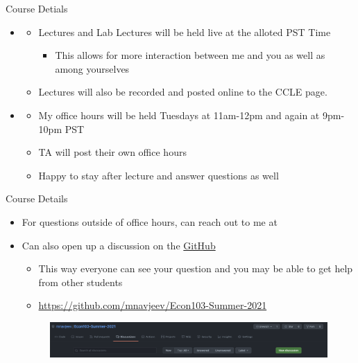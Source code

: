 \documentclass[notheorems,9pt]{beamer}
\begin{document}
\begin{frame}{Course Detials} 
	\begin{itemize}
		\item {}
		\begin{itemize}
			\item Lectures and Lab Lectures will be held live at the alloted PST Time
			\begin{itemize}
				\item This allows for more interaction between me and you as well as among yourselves
			\end{itemize}
			\item Lectures will also be recorded and posted online to the CCLE page.
		\end{itemize}
	\item {}
	\begin{itemize}
		\item My office hours will be held Tuesdays at 11am-12pm and again at 9pm-10pm PST
		\item TA will post their own office hours
		\item Happy to stay after lecture and answer questions as well
	\end{itemize}
	\end{itemize}
\end{frame}

\begin{frame}{Course Details} 
	\begin{itemize}
		\item For questions outside of office hours, can reach out to me at 
		\item Can also open up a discussion on the \href{https://github.com/mnavjeev/Econ103-Summer-2021}{GitHub} 
		\begin{itemize}
			\item This way everyone can see your question and you may be able to get help from other students
			\item \href{https://github.com/mnavjeev/Econ103-Summer-2021}{https://github.com/mnavjeev/Econ103-Summer-2021}
		\end{itemize}
		\begin{figure}[htpb]
			\centering
			\includegraphics[width=0.95\linewidth]{GitHub.png}
		\end{figure}
	\end{itemize}
\end{frame}
\end{document}

